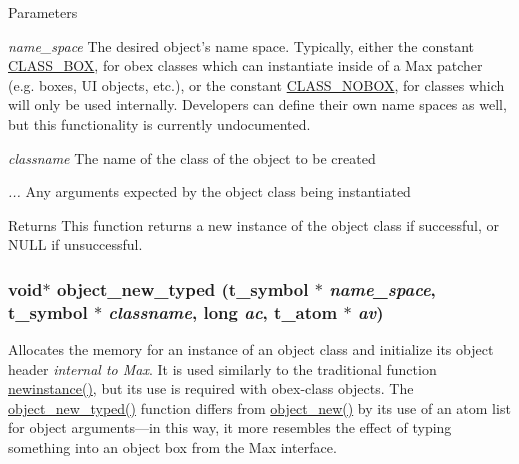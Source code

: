 \begin{DoxyParams}{Parameters}
\item[{\em name\_\-space}]The desired object's name space. Typically, either the constant \hyperlink{group__class_gaf640c99a1fceb8158c2d1e77381b0320}{CLASS\_\-BOX}, for obex classes which can instantiate inside of a Max patcher (e.g. boxes, UI objects, etc.), or the constant \hyperlink{group__class_ga090d3cbc4f137661806fc1b72249a791}{CLASS\_\-NOBOX}, for classes which will only be used internally. Developers can define their own name spaces as well, but this functionality is currently undocumented. \item[{\em classname}]The name of the class of the object to be created \item[{\em ...}]Any arguments expected by the object class being instantiated\end{DoxyParams}
\begin{DoxyReturn}{Returns}
This function returns a new instance of the object class if successful, or NULL if unsuccessful. 
\end{DoxyReturn}
\hypertarget{group__obj_ga459c71aca6316e345379eeb424ad56ff}{
\subsubsection[{object\_\-new\_\-typed}]{\setlength{\rightskip}{0pt plus 5cm}void$\ast$ object\_\-new\_\-typed ({\bf t\_\-symbol} $\ast$ {\em name\_\-space}, \/  {\bf t\_\-symbol} $\ast$ {\em classname}, \/  long {\em ac}, \/  {\bf t\_\-atom} $\ast$ {\em av})}}
\label{group__obj_ga459c71aca6316e345379eeb424ad56ff}


Allocates the memory for an instance of an object class and initialize its object header {\itshape internal to Max\/}. It is used similarly to the traditional function \hyperlink{group__class__old_ga4c1f100a92d6f519ba4e93665ff54998}{newinstance()}, but its use is required with obex-\/class objects. The \hyperlink{group__obj_ga459c71aca6316e345379eeb424ad56ff}{object\_\-new\_\-typed()} function differs from \hyperlink{group__obj_gac4b370265c776db4f545d257089af1cf}{object\_\-new()} by its use of an atom list for object arguments—in this way, it more resembles the effect of typing something into an object box from the Max interface.


